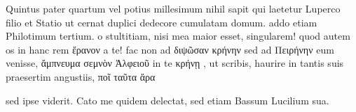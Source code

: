 


 Quintus pater quartum vel potius millesimum nihil sapit qui laetetur Luperco filio et Statio ut cernat duplici dedecore cumulatam domum. addo etiam Philotimum tertium. o stultitiam, nisi mea maior esset, singularem! quod autem os in hanc rem ἔρανον a te! fac non ad διψῶσαν κρήνην sed ad Πειρήνην eum venisse, ἄμπνευμα σεμνὸν Ἀλφειοῦ in te κρήνῃ , ut scribis, haurire in tantis suis praesertim angustiis, ποῖ ταῦτα ἄρα

 sed ipse viderit. Cato me quidem delectat, sed etiam Bassum Lucilium sua.
